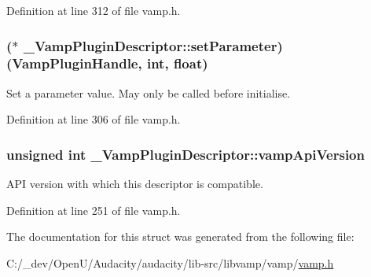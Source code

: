 Definition at line 312 of file vamp.\+h.

\subsubsection[{\texorpdfstring{set\+Parameter}{setParameter}}]{($\ast$ \+\_\+\+Vamp\+Plugin\+Descriptor\+::set\+Parameter) ({\bf Vamp\+Plugin\+Handle}, {\bf int}, float)}\hypertarget{struct___vamp_plugin_descriptor_abe2500934c8aae78d0ecd6b4541d8946}{}\label{struct___vamp_plugin_descriptor_abe2500934c8aae78d0ecd6b4541d8946}
Set a parameter value. May only be called before initialise. 

Definition at line 306 of file vamp.\+h.

\subsubsection[{\texorpdfstring{vamp\+Api\+Version}{vampApiVersion}}]{\setlength{\rightskip}{0pt plus 5cm}unsigned {\bf int} \+\_\+\+Vamp\+Plugin\+Descriptor\+::vamp\+Api\+Version}\hypertarget{struct___vamp_plugin_descriptor_ab6c87760e87ddaa9ac3491bccaaa28c2}{}\label{struct___vamp_plugin_descriptor_ab6c87760e87ddaa9ac3491bccaaa28c2}
A\+PI version with which this descriptor is compatible. 

Definition at line 251 of file vamp.\+h.



The documentation for this struct was generated from the following file\+:\begin{DoxyCompactItemize}
\item 
C\+:/\+\_\+dev/\+Open\+U/\+Audacity/audacity/lib-\/src/libvamp/vamp/\hyperlink{vamp_8h}{vamp.\+h}\end{DoxyCompactItemize}
